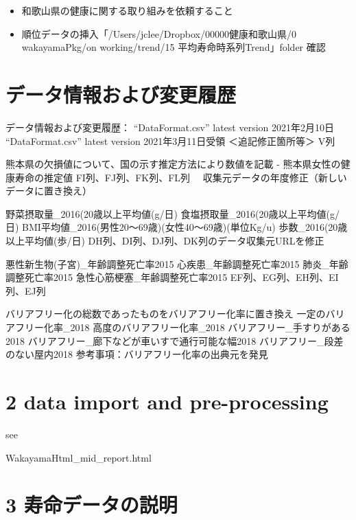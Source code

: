 


\begin{itemize}
\item 和歌山県の健康に関する取り組みを依頼すること
\item 順位データの挿入「/Users/jclee/Dropbox/00000健康和歌山県/0 wakayamaPkg/on working/trend/15 平均寿命時系列Trend」folder 確認

\end{itemize}




\chapter{データ情報および変更履歴}


データ情報および変更履歴：
“DataFormat.csv” latest version 2021年2月10日
“DataFormat.csv” latest version 2021年3月11日受領
＜追記修正箇所等＞
V列

熊本県の欠損値について、国の示す推定方法により数値を記載 -
熊本県女性の健康寿命の推定値
FI列、FJ列、FK列、FL列 　収集元データの年度修正（新しいデータに置き換え）

野菜摂取量\_2016(20歳以上平均値(g/日)
食塩摂取量\_2016(20歳以上平均値(g/日)
BMI平均値\_2016(男性20〜69歳)(女性40〜69歳)(単位Kg/u)
歩数\_2016(20歳以上平均値(歩/日)
DH列、DI列、DJ列、DK列のデータ収集元URLを修正

悪性新生物(子宮)\_年齢調整死亡率2015
心疾患\_年齢調整死亡率2015
肺炎\_年齢調整死亡率2015
急性心筋梗塞\_年齢調整死亡率2015
EF列、EG列、EH列、EI列、EJ列

バリアフリー化の総数であったものをバリアフリー化率に置き換え
一定のバリアフリー化率\_2018
高度のバリアフリー化率\_2018
バリアフリー\_手すりがある2018
バリアフリー\_廊下などが車いすで通行可能な幅2018
バリアフリー\_段差のない屋内2018
参考事項：バリアフリー化率の出典元を発見


\chapter{2 data import and pre-processing}



see

WakayamaHtml\_mid\_report.html





\chapter{3 寿命データの説明}

